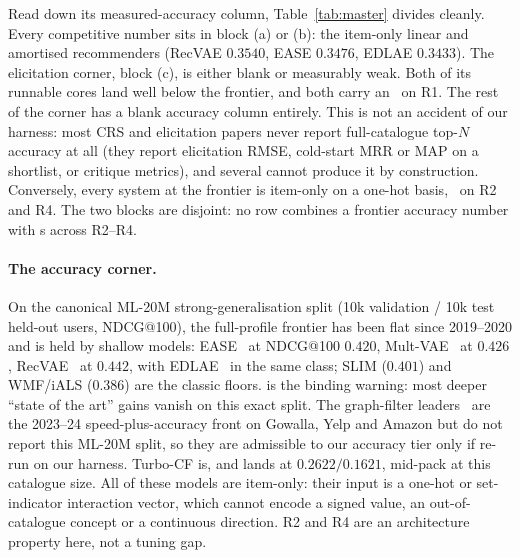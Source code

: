 \documentclass[acmsmall,review,anonymous]{acmart}
\newcommand{\cmark}{\ding{51}}
\newcommand{\xmark}{\ding{55}}
\begin{document}
Read down its measured-accuracy column, Table~\ref{tab:master} divides cleanly. Every competitive number sits in block (a) or (b): the item-only linear and amortised recommenders (RecVAE $0.3540$, EASE $0.3476$, EDLAE $0.3433$). The elicitation corner, block (c), is either blank or measurably weak. Both of its runnable cores land well below the frontier, and both carry an \xmark\ on R1. The rest of the corner has a blank accuracy column entirely. This is not an accident of our harness: most CRS and elicitation papers never report full-catalogue top-$N$ accuracy at all (they report elicitation RMSE, cold-start MRR or MAP on a shortlist, or critique metrics), and several cannot produce it by construction. Conversely, every system at the frontier is item-only on a one-hot basis, \xmark\ on R2 and R4. The two blocks are disjoint: no row combines a frontier accuracy number with \cmark s across R2--R4.

\paragraph{The accuracy corner.} On the canonical ML-20M strong-generalisation split (10k validation / 10k test held-out users, NDCG@100), the full-profile frontier has been flat since 2019--2020 and is held by shallow models: EASE~\citep{steck2019ease} at NDCG@100 $0.420$, Mult-VAE~\citep{liang2018variational} at $0.426$, RecVAE~\citep{ren2020recvae} at $0.442$, with EDLAE~\citep{steck2020edlae} in the same class; SLIM ($0.401$) and WMF/iALS ($0.386$) are the classic floors. \citet{dacrema2019progress} is the binding warning: most deeper ``state of the art'' gains vanish on this exact split. The graph-filter leaders~\citep{shen2021gfcf,choi2023bspm,park2024turbocf} are the 2023--24 speed-plus-accuracy front on Gowalla, Yelp and Amazon but do not report this ML-20M split, so they are admissible to our accuracy tier only if re-run on our harness. Turbo-CF is, and lands at $0.2622/0.1621$, mid-pack at this catalogue size. All of these models are item-only: their input is a one-hot or set-indicator interaction vector, which cannot encode a signed value, an out-of-catalogue concept or a continuous direction. R2 and R4 are an architecture property here, not a tuning gap.
\end{document}
